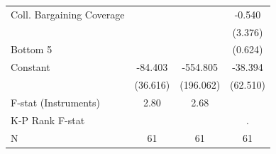 \begin{table}[htbp]
\begin{tabular}{l*{3}{c}}
\addlinespace
Coll. Bargaining Coverage&            &            &      -0.540\\
                    &            &            &     (3.376)\\
\addlinespace
Bottom 5%
                    &            &            &     (0.624)\\
\addlinespace
Constant            &     -84.403&    -554.805&     -38.394\\
                    &    (36.616)&   (196.062)&    (62.510)\\
\midrule
F-stat (Instruments)&        2.80&        2.68&            \\
K-P Rank F-stat     &            &            &           .\\
N                   &          61&          61&          61\\
\bottomrule
\end{tabular}
\end{table}
